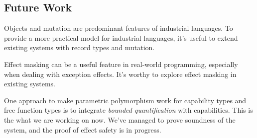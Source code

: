 \subsection{Future Work}

Objects and mutation are predominant features of industrial
languages. To provide a more practical model for industrial languages,
it's useful to extend existing systems with record types and mutation.

Effect masking can be a useful feature in real-world programming,
especially when dealing with exception effects. It's worthy to explore
effect masking in existing systems.

One approach to make parametric polymorphism work for capability types
and free function types is to integrate \emph{bounded quantification}
with capabilities. This is the what we are working on now. We've
managed to prove soundness of the system, and the proof of effect
safety is in progress.


